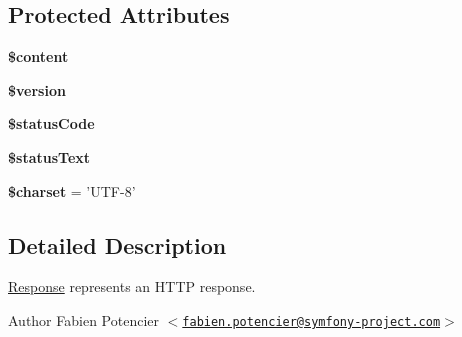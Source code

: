 \subsection*{\-Protected \-Attributes}
\begin{DoxyCompactItemize}
\item 
\hypertarget{class_symfony_1_1_component_1_1_http_foundation_1_1_response_a57b284fe00866494b33afa80ba729bed}{
{\bfseries \$content}}
\label{class_symfony_1_1_component_1_1_http_foundation_1_1_response_a57b284fe00866494b33afa80ba729bed}

\item 
\hypertarget{class_symfony_1_1_component_1_1_http_foundation_1_1_response_a17c8948c68aa44fa9961ae169b6a8961}{
{\bfseries \$version}}
\label{class_symfony_1_1_component_1_1_http_foundation_1_1_response_a17c8948c68aa44fa9961ae169b6a8961}

\item 
\hypertarget{class_symfony_1_1_component_1_1_http_foundation_1_1_response_a284cc112f82dd96d28c4b7ad338a8f3d}{
{\bfseries \$status\-Code}}
\label{class_symfony_1_1_component_1_1_http_foundation_1_1_response_a284cc112f82dd96d28c4b7ad338a8f3d}

\item 
\hypertarget{class_symfony_1_1_component_1_1_http_foundation_1_1_response_ac51d4079cb386b1268110b732f7f9405}{
{\bfseries \$status\-Text}}
\label{class_symfony_1_1_component_1_1_http_foundation_1_1_response_ac51d4079cb386b1268110b732f7f9405}

\item 
\hypertarget{class_symfony_1_1_component_1_1_http_foundation_1_1_response_af10158dd74b75f1d337e83102d6b82ce}{
{\bfseries \$charset} = '\-U\-T\-F-\/8'}
\label{class_symfony_1_1_component_1_1_http_foundation_1_1_response_af10158dd74b75f1d337e83102d6b82ce}

\end{DoxyCompactItemize}


\subsection{\-Detailed \-Description}
\hyperlink{class_symfony_1_1_component_1_1_http_foundation_1_1_response}{\-Response} represents an \-H\-T\-T\-P response.

\begin{DoxyAuthor}{\-Author}
\-Fabien \-Potencier $<$\href{mailto:fabien.potencier@symfony-project.com}{\tt fabien.\-potencier@symfony-\/project.\-com}$>$ 
\end{DoxyAuthor}


